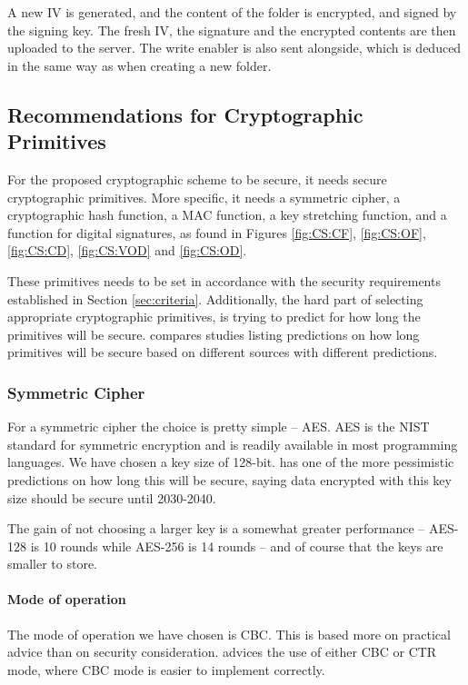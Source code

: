 \documentclass[pdftex,english,10pt,b5paper,twoside]{book}
\begin{document}
A new \ac{IV} is generated, and the content of the folder is encrypted, and
signed by the signing key. The fresh \ac{IV}, the signature and the encrypted
contents are then uploaded to the server. The write enabler is also sent
alongside, which is deduced in the same way as when creating a new folder.

\subsection{Recommendations for Cryptographic Primitives}
\label{sec:cryptoprimitivechoice}

For the proposed cryptographic scheme to be secure, it needs secure
cryptographic primitives. More specific, it needs a symmetric cipher, a
cryptographic hash function, a \ac{MAC} function, a key stretching function,
and a function for digital signatures, as found in Figures \ref{fig:CS:CF},
\ref{fig:CS:OF}, \ref{fig:CS:CD}, \ref{fig:CS:VOD} and \ref{fig:CS:OD}.

These primitives needs to be set in accordance with the security requirements
established in Section \ref{sec:criteria}. Additionally, the hard part of
selecting appropriate cryptographic primitives, is trying to predict for how
long the primitives will be secure. \citet{keylength} compares studies listing
predictions on how long primitives will be secure based on different sources
with different predictions.

\subsubsection{Symmetric Cipher}

For a symmetric cipher the choice is pretty simple -- \ac{AES}. \ac{AES} is the
NIST standard for symmetric encryption and is readily available in most
programming languages. We have chosen a key size of 128-bit.
 \cite{ecrypt2_2010} has one of the more pessimistic
predictions on how long this will be secure, saying data encrypted with this
key size should be secure until 2030-2040.

The gain of not choosing a larger key is a somewhat greater
performance -- \ac{AES}-128 is 10 rounds while \ac{AES}-256 is 14
rounds -- and of course that the keys are smaller to store.

\paragraph{Mode of operation} The mode of operation we have chosen is \ac{CBC}.
This is based more on practical advice than on security consideration.
\citet{schneier} advices the use of either \ac{CBC} or \ac{CTR} mode, where
\ac{CBC} mode is easier to implement correctly.
\end{document}
